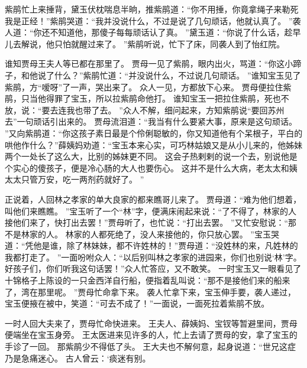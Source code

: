 紫鹃忙上来捶背，黛玉伏枕喘息半晌，推紫鹃道：“你不用捶，你竟拿绳子来勒死我是正经！”紫鹃哭道：“我并没说什么，不过是说了几句顽话，他就认真了。
”袭人道：“你还不知道他，那傻子每每顽话认了真。
”黛玉道：“你说了什么话，趁早儿去解说，他只怕就醒过来了。
”紫鹃听说，忙下了床，同袭人到了怡红院。
\par
谁知贾母王夫人等已都在那里了。
贾母一见了紫鹃，眼内出火，骂道：“你这小蹄子，和他说了什么？”紫鹃忙道：“并没说什么，不过说几句顽话。
”谁知宝玉见了紫鹃，方“嗳呀”了一声，哭出来了。
众人一见，方都放下心来。
贾母便拉住紫鹃，只当他得罪了宝玉，所以拉紫鹃命他打。
谁知宝玉一把拉住紫鹃，死也不放，说：“要去连我也带了去。
”众人不解，细问起来，方知紫鹃说“要回苏州去”一句顽话引出来的。
贾母流泪道：“我当有什么要紧大事，原来是这句顽话。
”又向紫鹃道：“你这孩子素日最是个伶俐聪敏的，你又知道他有个呆根子，平白的哄他作什么？”薛姨妈劝道：“宝玉本来心实，可巧林姑娘又是从小儿来的，他姊妹两个一处长了这么大，比别的姊妹更不同。
这会子热剌剌的说一个去，别说他是个实心的傻孩子，便是冷心肠的大人也要伤心。
这并不是什么大病，老太太和姨太太只管万安，吃一两剂药就好了。
”\par
正说着，人回林之孝家的单大良家的都来瞧哥儿来了。
贾母道：“难为他们想着，叫他们来瞧瞧。
”宝玉听了一个“林”字，便满床闹起来说：“了不得了，林家的人接他们来了，快打出去罢！”贾母听了，也忙说：“打出去罢。
”又忙安慰说：“那不是林家的人。
林家的人都死绝了，没人来接他的，你只放心罢。
”宝玉哭道：“凭他是谁，除了林妹妹，都不许姓林的！”贾母道：“没姓林的来，凡姓林的我都打走了。
”一面吩咐众人：“以后别叫林之孝家的进园来，你们也别说‘林’字。
好孩子们，你们听我这句话罢！”众人忙答应，又不敢笑。
一时宝玉又一眼看见了十锦格子上陈设的一只金西洋自行船，便指着乱叫说：“那不是接他们来的船来了，湾在那里呢。
”贾母忙命拿下来。
袭人忙拿下来，宝玉伸手要，袭人递过，宝玉便掖在被中，笑道：“可去不成了！”一面说，一面死拉着紫鹃不放。
\par
一时人回大夫来了，贾母忙命快进来。
王夫人、薛姨妈、宝钗等暂避里间，贾母便端坐在宝玉身旁。
王太医进来见许多的人，忙上去请了贾母的安，拿了宝玉的手诊了一回。
那紫鹃少不得低了头。
王大夫也不解何意，起身说道：“世兄这症乃是急痛迷心。
古人曾云：‘痰迷有别。
